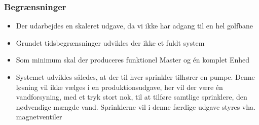 \subsubsection*{Begrænsninger}
\begin{itemize}
\item Der udarbejdes en skaleret udgave, da vi ikke har adgang til en hel golfbane
\item Grundet tidsbegrænsninger udvikles der ikke et fuldt system 
\item Som minimum skal der produceres funktionel Master og én komplet Enhed
\item Systemet udvikles således, at der til hver sprinkler tilhører en pumpe. Denne løsning vil ikke vælges i en produktionsudgave, her vil der være én vandforsyning, med et tryk stort nok, til at tilføre samtlige sprinklere, den nødvendige mængde vand. Sprinklerne vil i denne færdige udgave styres vha. magnetventiler 
\end{itemize}



